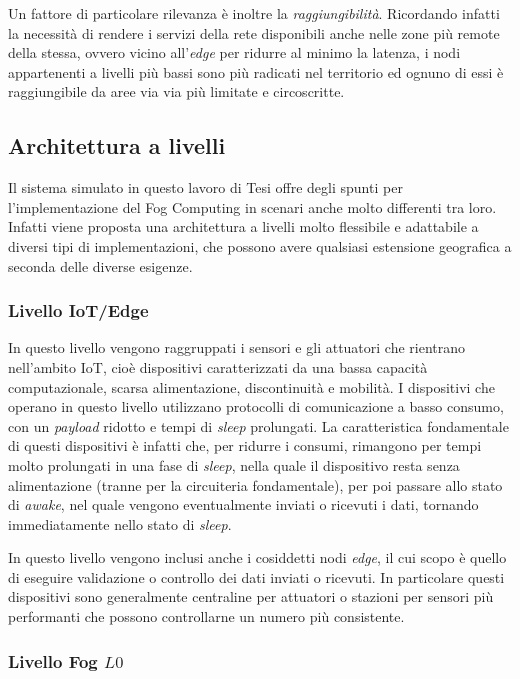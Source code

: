 Un fattore di particolare rilevanza è inoltre la \textit{raggiungibilità}. Ricordando infatti la necessità di rendere i servizi della rete disponibili anche nelle zone più remote della stessa, ovvero vicino all'\textit{edge} per ridurre al minimo la latenza, i nodi appartenenti a livelli più bassi sono più radicati nel territorio ed ognuno di essi è raggiungibile da aree via via più limitate e circoscritte. 

\subsection{Architettura a livelli}

Il sistema simulato in questo lavoro di Tesi offre degli spunti per l'implementazione del Fog Computing in scenari anche molto differenti tra loro. Infatti viene proposta una architettura a livelli molto flessibile e adattabile a diversi tipi di implementazioni, che possono avere qualsiasi estensione geografica a seconda delle diverse esigenze.

\subsubsection{Livello IoT/Edge}

In questo livello vengono raggruppati i sensori e gli attuatori che rientrano nell'ambito IoT, cioè dispositivi caratterizzati da una bassa capacità computazionale, scarsa alimentazione, discontinuità e mobilità. I dispositivi che operano in questo livello utilizzano protocolli di comunicazione a basso consumo, con un \textit{payload} ridotto e tempi di \textit{sleep} prolungati. La caratteristica fondamentale di questi dispositivi è infatti che, per ridurre i consumi, rimangono per tempi molto prolungati in una fase di \textit{sleep}, nella quale il dispositivo resta senza alimentazione (tranne per la circuiteria fondamentale), per poi passare allo stato di \textit{awake}, nel quale vengono eventualmente inviati o ricevuti i dati, tornando immediatamente nello stato di \textit{sleep}.

In 	questo livello vengono inclusi anche i cosiddetti nodi \textit{edge}, il cui scopo è quello di eseguire validazione o controllo dei dati inviati o ricevuti. In particolare questi dispositivi sono generalmente centraline per attuatori o stazioni per sensori più performanti che possono controllarne un numero più consistente.

\subsubsection{Livello Fog $L0$}

